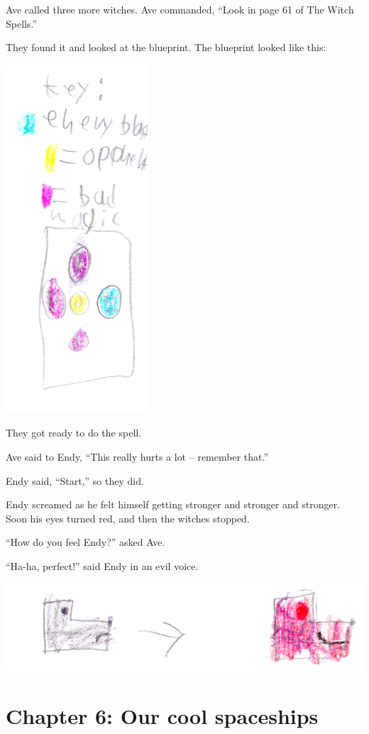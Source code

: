\documentclass[12pt,oneside]{krantz}
\begin{document}
Ave called three more witches. Ave commanded, ``Look in page 61 of The
Witch Spells.''

They found it and looked at the blueprint. The blueprint looked like
this:

\includegraphics[width=2.08333in,height=\textheight]{img/key.jpg}

They got ready to do the spell.

Ave said to Endy, ``This really hurts a lot -- remember that.''

Endy said, ``Start,'' so they did.

Endy screamed as he felt himself getting stronger and stronger and
stronger. Soon his eyes turned red, and then the witches stopped.

``How do you feel Endy?'' asked Ave.

``Ha-ha, perfect!'' said Endy in an evil voice.

\includegraphics[width=6.25in,height=\textheight]{img/endy.jpg}

\hypertarget{chapter-6-our-cool-spaceships}{%
\chapter*{Chapter 6: Our cool
spaceships}\label{chapter-6-our-cool-spaceships}}
\end{document}
